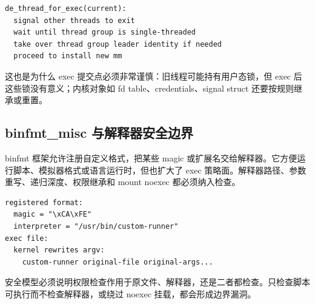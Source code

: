 \begin{lstlisting}
de_thread_for_exec(current):
  signal other threads to exit
  wait until thread group is single-threaded
  take over thread group leader identity if needed
  proceed to install new mm
\end{lstlisting}

这也是为什么 exec 提交点必须非常谨慎：旧线程可能持有用户态锁，但 exec 后这些锁没有意义；内核对象如 fd table、credentials、signal struct 还要按规则继承或重置。

\subsection{binfmt\_misc 与解释器安全边界}

binfmt 框架允许注册自定义格式，把某些 magic 或扩展名交给解释器。它方便运行脚本、模拟器格式或语言运行时，但也扩大了 exec 策略面。解释器路径、参数重写、递归深度、权限继承和 mount noexec 都必须纳入检查。

\begin{lstlisting}
registered format:
  magic = "\xCA\xFE"
  interpreter = "/usr/bin/custom-runner"
exec file:
  kernel rewrites argv:
    custom-runner original-file original-args...
\end{lstlisting}

安全模型必须说明权限检查作用于原文件、解释器，还是二者都检查。只检查脚本可执行而不检查解释器，或绕过 noexec 挂载，都会形成边界漏洞。
